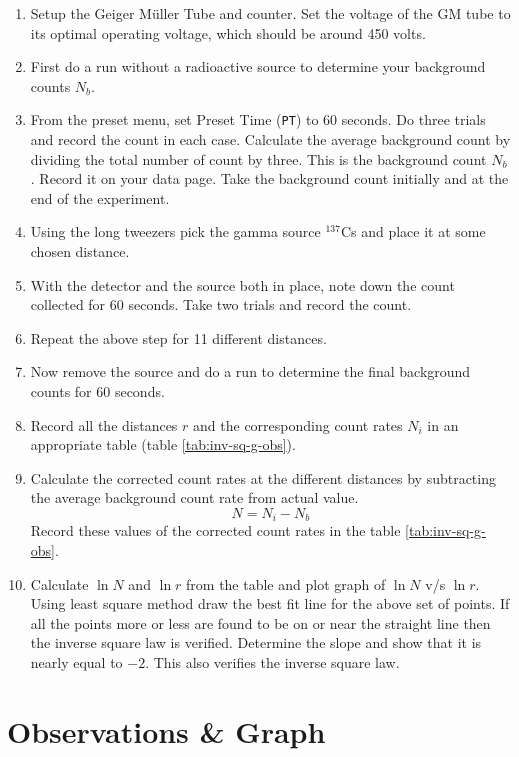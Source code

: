 	\begin{enumerate}
		\item 	 Setup the Geiger M{\"u}ller Tube and counter. Set the voltage of the GM tube to its optimal operating voltage, which should be around 450 volts.
		\item 	 First do a run without a radioactive source to determine your background counts $ N_b $.
		\item 	 From the preset menu, set Preset Time (\texttt{PT}) to 60 seconds. Do three trials and record the count in each case. Calculate the average background count by dividing the total number of count by three. This is the background count $ N_b $. Record it on your data page. Take the background count initially and at the end of the experiment.
		\item  	Using the long tweezers pick the gamma source $ ^{137} $Cs and place it at some chosen distance.
		\item 	With the detector and the source both in place, note down the count collected for 60 seconds. Take two trials and record the count.
		\item  Repeat the above step for 11 different distances.
		\item 	Now remove the source and do a run to determine the final background counts for 60 seconds.
		\item 	Record all the distances $ r $ and the corresponding count rates $ N_i $ in an appropriate table (table \ref{tab:inv-sq-g-obs}).
		\item 	Calculate the corrected count rates at the different distances by subtracting the average background count rate from actual value. 
		\begin{equation}\label{eqn:background-count}
			N = N_i - N_b
		\end{equation}
		Record these values of the corrected count rates in the table \ref{tab:inv-sq-g-obs}.
		\item 	Calculate $ \ln N $ and $ \ln r $ from the table and plot graph of $ \ln N $ v/s $ \ln r $. Using least square method draw the best fit line for the above set of points. If all the points more or less are found to be on or near the straight line then the inverse square law is verified. Determine the slope and show that it is nearly equal to $ -2 $. This also verifies the inverse square law.
		
	\end{enumerate}
	
	\section{Observations \& Graph}
	
